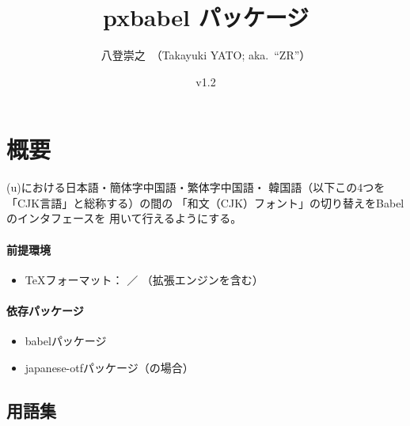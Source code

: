 \documentclass[uplatex,dvipdfmx,a4paper]{jsarticle}
\newcommand{\PkgVersion}{1.2}
\newcommand{\PkgDate}{2021/05/22}
\newcommand{\Pkg}[1]{\textsf{#1}}
\begin{document}
\title{\Pkg{pxbabel} パッケージ}
\author{八登崇之\ （Takayuki YATO; aka.~``ZR''）}
\date{v\PkgVersion \quad [\PkgDate]}
\maketitle

\section{概要}
\label{sec:Overview}

{(u)\pLaTeX}における日本語・簡体字中国語・繁体字中国語・
韓国語（以下この4つを「CJK言語」と総称する）の間の
「和文（CJK）フォント」の切り替えをBabelのインタフェースを
用いて行えるようにする。

\paragraph{前提環境}

\begin{itemize}
\item {\TeX}フォーマット： {\pLaTeX}／{\upLaTeX}
  （拡張エンジンを含む）
\end{itemize}

\paragraph{依存パッケージ}

\begin{itemize}
\item \Pkg{babel}パッケージ
\item \Pkg{japanese-otf}パッケージ（{\pLaTeX}の場合）
\end{itemize}

\subsection{用語集}
\label{ssec:terminology}
\end{document}
